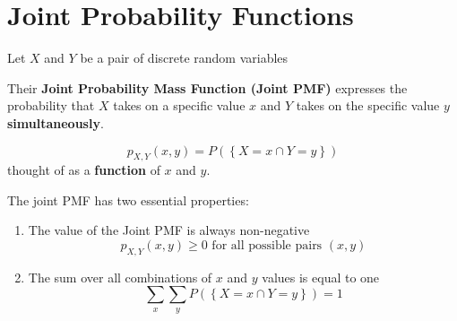 \documentclass[notes=show,handout]{beamer}\usepackage[]{graphicx}\usepackage[]{color}
\renewcommand{\Pr}{P}
\begin{document}
\section{Joint Probability Functions}

\begin{frame}{\secname}

  \begin{definition}
  Let $X$ and $Y$ be a pair of discrete random variables

  \medskip

  Their  \textbf{Joint Probability Mass Function (Joint PMF)} expresses the probability that $X$ takes on a specific
  value $x$ and $Y$ takes on the specific value $y$ \textbf{simultaneously}.


  \begin{equation*}
  p_{X,Y}\left( x,y\right) =\Pr (\left\{ X=x\cap Y=y\right\})
  \end{equation*}
  thought of as a \textbf{function} of $x$ and $y$.
  \end{definition}

\end{frame}

\begin{frame}{\secname}

  The joint PMF has two essential properties:

  \medskip

  \begin{enumerate}
  \item The value of the Joint PMF is always non-negative
  $$p_{X,Y}\left( x,y\right) \geq 0 \text{\ for all possible pairs \ }
  \left(x,y\right)$$

  \item The sum over all combinations of $x$ and $y$ values is equal to one
  $$\sum_{x}\sum_{y}\Pr ( \left\{ X=x\cap Y=y\right\}) =1$$
  \end{enumerate}

\end{frame}
\end{document}

